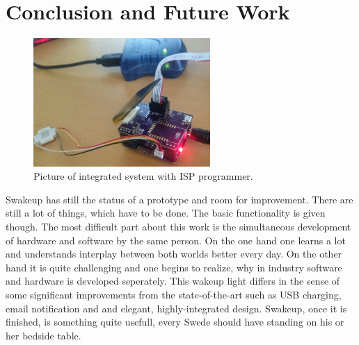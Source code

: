\chapter{Conclusion and Future Work}
\label{chap:conclusion}
\begin{figure}[H] 
	\centering 
	\label{fig:demo}
	\includegraphics[width=0.6\textwidth]{./fig/demo.jpg}
	\caption{Picture of integrated system with ISP programmer.} 
\end{figure} Swakeup has still the
status of a prototype and room for improvement. There are
still a lot of things, which have to be done. The basic functionality is given
though. The most difficult part about this work is the simultaneous
development of hardware and software by the same person. On the one hand one
learns a lot and understands interplay between both worlds better every day. On
the other hand it is quite challenging and one begins to realize, why
in industry software and hardware is developed seperately.  \newpar This wakeup
light differs in the sense of some significant improvements from the
state-of-the-art such as USB charging, email notification and and elegant,
highly-integrated design. Swakeup, once it is finished, is something quite
usefull, every Swede should have standing on his or her bedside table. 
